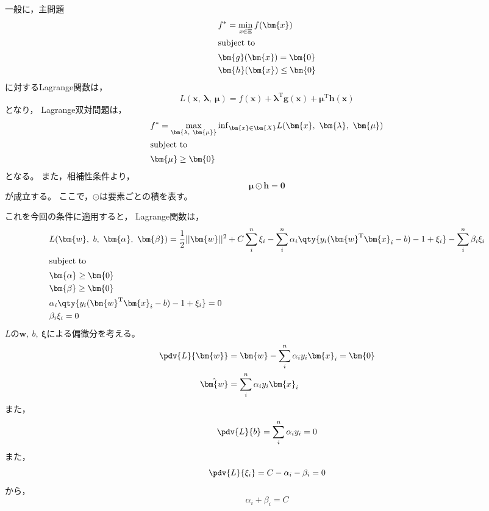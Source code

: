 \documentclass[class=jsarticle, crop=false, dvipdfmx, fleqn]{standalone}
\begin{document}
一般に，主問題
\begin{align}
	& f^{*} = \min_{x \in \Xi} f(\bm{x}) \\
\intertext{subject to}
	& \bm{g}(\bm{x}) = \bm{0} \\
	& \bm{h}(\bm{x}) \le \bm{0}
\end{align}
に対するLagrange関数は，
\begin{equation}
	L(\bm{x},\ \bm{\lambda},\ \bm{\mu}) = f(\bm{x}) + \bm{\lambda}^\mathrm{T} \bm{g}(\bm{x}) + \bm{\mu}^\mathrm{T} \bm{h}(\bm{x})
\end{equation}
となり，
Lagrange双対問題は，
\begin{align}
	& f^{*} = \max_{\bm{\lambda,\ \bm{\mu}}} \mathrm{inf}_{\bm{x} \in \bm{X}} L(\bm{x},\ \bm{\lambda},\ \bm{\mu}) \\
\intertext{subject to}
	& \bm{\mu} \ge \bm{0}
\end{align}
となる。
また，相補性条件より，
\begin{equation}
	\bm{\mu} \odot \bm{h} = \bm{0}
\end{equation}
が成立する。
ここで，\(\odot\)は要素ごとの積を表す。

これを今回の条件に適用すると，
Lagrange関数は，
\begin{align}
	& L(\bm{w},\ b,\ \bm{\alpha},\ \bm{\beta})
		= \frac{1}{2} ||\bm{w}||^2 + C \sum_{i}^{n} \xi_i
			- \sum_{i}^{n} \alpha_i \qty{y_i (\bm{w}^\mathrm{T} \bm{x}_i - b) - 1 + \xi_i}
			- \sum_{i}^{n} \beta_i \xi_i
	\label{eq:lagrangian} \\
\intertext{subject to}
	& \bm{\alpha} \ge \bm{0} \label{eq:cond_alpha} \\
	& \bm{\beta} \ge \bm{0} \label{eq:cond_beta} \\
	& \alpha_i \qty{y_i (\bm{w}^\mathrm{T} \bm{x}_i - b) - 1 + \xi_i} = 0 \label{eq:cond_comple_alpha} \\
	& \beta_i \xi_i = 0 \label{eq:cond_comple_beta}
\end{align}
\(L\)の\(\bm{w},\ b,\ \bm{\xi}\)による偏微分を考える。
\begin{align}
	\pdv{L}{\bm{w}}
		& = \bm{w} - \sum_{i}^{n} \alpha_i y_i \bm{x}_i
		= \bm{0} \\
	\hat{\bm{w}} & = \sum_{i}^{n} \alpha_i y_i \bm{x}_i
	\label{eq:w_hat}
\end{align}
また，
\begin{equation}
	\pdv{L}{b}
		= \sum_{i}^{n} \alpha_i y_i
		= 0
	\label{eq:pdv_b}
\end{equation}
また，
\begin{equation}
	\pdv{L}{\xi_i}
		= C - \alpha_i - \beta_i
		= 0
\end{equation}
から，
\begin{equation}
	\alpha_i + \beta_i = C
	\label{eq:alpha_beta_c}
\end{equation}
\end{document}
